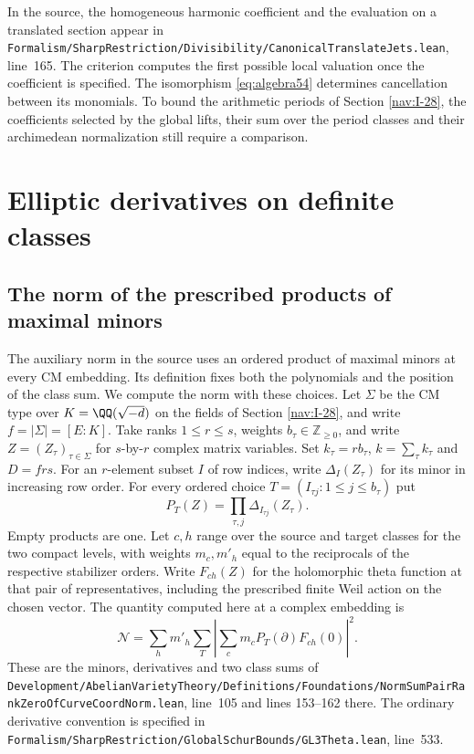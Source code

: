 \documentclass[a4paper,11pt]{article}
\theoremstyle{definition}
\theoremstyle{remark}
\newcommand{\ZZ}{\mathbb Z}\newcommand{\ord}{\operatorname{ord}}
\newcommand{\srcloc}[2]{{\small\nolinkurl{#1.lean}}, line~#2}
\numberwithin{equation}{section}
\begin{document}
In the source, the homogeneous harmonic coefficient and the
evaluation on a translated section appear in
\srcloc{Formalism/SharpRestriction/Divisibility/CanonicalTranslateJets}{165}.
The criterion computes the first possible local valuation once the
coefficient is specified. The isomorphism \eqref{eq:algebra54}
determines cancellation between its monomials. To bound the
arithmetic periods of Section \ref{nav:I-28}, the coefficients
selected by the global lifts, their sum over the period classes
and their archimedean normalization still require a comparison.

\section{Elliptic derivatives on definite classes}\label{nav:g-V-1}

\subsection{The norm of the prescribed products of maximal minors}\label{nav:V-10}
\label{sec:min55}

The auxiliary norm in the source uses an ordered product of maximal
minors at every CM embedding. Its definition fixes both the
polynomials and the position of the class sum. We compute the norm
with these choices. Let \(\Sigma\) be the CM type over
\(K=\QQ(\sqrt{-d})\) on the fields of
Section \ref{nav:I-28},
and write \(f=|\Sigma|=[E:K]\).
Take ranks \(1\le r\le s\), weights \(b_\tau\in\ZZ_{\ge0}\), and
write \(Z=(Z_\tau)_{\tau\in\Sigma}\) for \(s\)-by-\(r\) complex
matrix variables. Set \(k_\tau=rb_\tau\), \(k=\sum_\tau k_\tau\)
and \(D=frs\). For an \(r\)-element subset \(I\) of row indices,
write \(\Delta_I(Z_\tau)\) for its minor in increasing row order.
For every ordered choice \(T=(I_{\tau j}:1\le j\le b_\tau)\) put
\[
              P_T(Z)=\prod_{\tau,j}\Delta_{I_{\tau j}}(Z_\tau).
\]
Empty products are one. Let \(c,h\) range over the source and target
classes for the two compact levels, with weights \(m_c,m'_h\) equal
to the reciprocals of the respective stabilizer orders. Write
\(F_{ch}(Z)\) for the holomorphic theta function at that pair of
representatives, including the prescribed finite Weil action on the
chosen vector. The quantity computed here at a complex embedding is
\begin{equation}
 \mathcal N=\sum_h m'_h\sum_T
        \left|\sum_c m_c P_T(\partial)F_{ch}(0)\right|^2 .
                                                    \label{eq:pair55}
\end{equation}
These are the minors, derivatives and two class sums of
\srcloc{Development/AbelianVarietyTheory/Definitions/Foundations/NormSumPairRankZeroOfCurveCoordNorm}{105}
and lines 153--162 there. The ordinary derivative convention is
specified in
\srcloc{Formalism/SharpRestriction/GlobalSchurBounds/GL3Theta}{533}.
\end{document}
